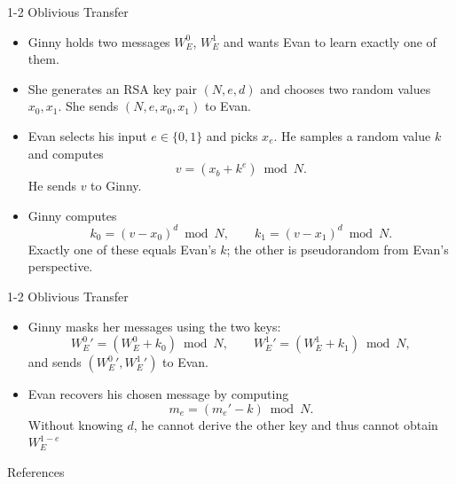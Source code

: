 \documentclass[t,aspectratio=169]{beamer}
\begin{document}
\begin{frame}{1-2 Oblivious Transfer \cite{chou2015simplest}}
    \begin{itemize}
  \item Ginny holds two messages $W^0_E$, $W^1_E$ and wants Evan to learn exactly one of them.
  \item She generates an RSA key pair $(N, e, d)$ and chooses two random values $x_0, x_1$.  
        She sends $(N, e, x_0, x_1)$ to Evan.
  \item Evan selects his input $e \in \{0,1\}$ and picks $x_e$.  
        He samples a random value $k$ and computes
\[
            v = (x_b + k^e) \bmod N.
        \]
        He sends $v$ to Ginny.
  \item Ginny computes
\[
            k_0 = (v - x_0)^d \bmod N, \qquad
            k_1 = (v - x_1)^d \bmod N.
        \]
      Exactly one of these equals Evan's $k$; the other is pseudorandom from Evan's perspective.
 \end{itemize}

 \end{frame}
 \begin{frame}{1-2 Oblivious Transfer \cite{chou2015simplest}}
\begin{itemize}

  \item Ginny masks her messages using the two keys:
\[
            W^0_E' = (W^0_E + k_0) \bmod N, \qquad
            W^1_E' = (W^1_E + k_1) \bmod N,
        \]
        and sends $(W^0_E', W^1_E')$ to Evan.
  \item Evan recovers his chosen message by computing
\[
            m_e = (m_e' - k) \bmod N.
        \]
        Without knowing $d$, he cannot derive the other key and thus cannot obtain $W^{1-e}_E$
\end{itemize}
\end{frame}

\begin{frame}{References}
    \printbibliography
\end{frame}
\end{document}
